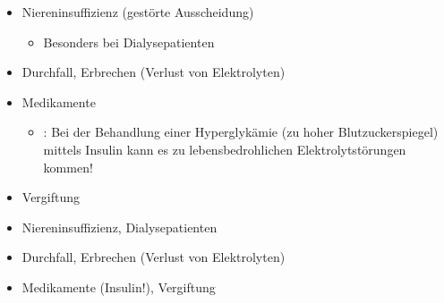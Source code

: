 {%
\label{topic:elektrolytstoerungen}
\label{topic:dialyse-elektrolyte}
%
\begin{itemize}
    \item Niereninsuffizienz (gestörte Ausscheidung)
    \begin{itemize}
        \item Besonders bei
        Dialysepatienten
    \end{itemize}
    \item Durchfall, Erbrechen (Verlust von Elektrolyten)
    \item Medikamente
    \begin{itemize}
      \item {}: Bei
      der Behandlung einer Hyperglykämie (zu hoher Blutzuckerspiegel) 
      mittels Insulin kann es
      zu lebensbedrohlichen Elektrolytstörungen kommen!
    \end{itemize}
    \item Vergiftung
\end{itemize}
}{%
\begin{itemize}
    \item Niereninsuffizienz, Dialysepatienten
    \item Durchfall, Erbrechen (Verlust von Elektrolyten)
    \item Medikamente (Insulin!), Vergiftung
\end{itemize}
}{}{}{}

